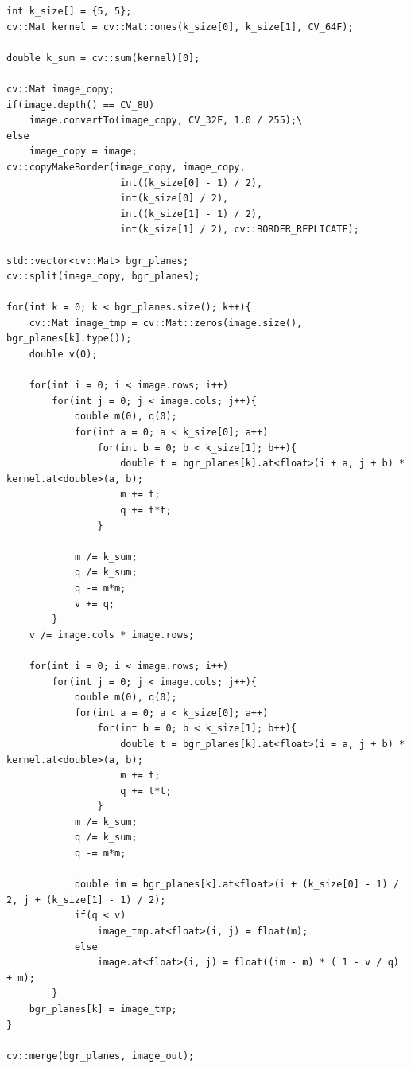 \begin{lstlisting}[style=cpp_white, caption={Исходный код Винеровского фильтра}]
int k_size[] = {5, 5};
cv::Mat kernel = cv::Mat::ones(k_size[0], k_size[1], CV_64F);

double k_sum = cv::sum(kernel)[0];

cv::Mat image_copy;
if(image.depth() == CV_8U)
    image.convertTo(image_copy, CV_32F, 1.0 / 255);\
else    
    image_copy = image;
cv::copyMakeBorder(image_copy, image_copy,
                    int((k_size[0] - 1) / 2),
                    int(k_size[0] / 2),
                    int((k_size[1] - 1) / 2),
                    int(k_size[1] / 2), cv::BORDER_REPLICATE);

std::vector<cv::Mat> bgr_planes;
cv::split(image_copy, bgr_planes);

for(int k = 0; k < bgr_planes.size(); k++){
    cv::Mat image_tmp = cv::Mat::zeros(image.size(), bgr_planes[k].type());
    double v(0);

    for(int i = 0; i < image.rows; i++)
        for(int j = 0; j < image.cols; j++){
            double m(0), q(0);
            for(int a = 0; a < k_size[0]; a++)
                for(int b = 0; b < k_size[1]; b++){
                    double t = bgr_planes[k].at<float>(i + a, j + b) * kernel.at<double>(a, b);
                    m += t;
                    q += t*t;
                }
            
            m /= k_sum;
            q /= k_sum;
            q -= m*m;
            v += q;
        }
    v /= image.cols * image.rows;

    for(int i = 0; i < image.rows; i++)
        for(int j = 0; j < image.cols; j++){
            double m(0), q(0);
            for(int a = 0; a < k_size[0]; a++)
                for(int b = 0; b < k_size[1]; b++){
                    double t = bgr_planes[k].at<float>(i = a, j + b) * kernel.at<double>(a, b);
                    m += t;
                    q += t*t;
                }
            m /= k_sum;
            q /= k_sum;
            q -= m*m;

            double im = bgr_planes[k].at<float>(i + (k_size[0] - 1) / 2, j + (k_size[1] - 1) / 2);
            if(q < v)
                image_tmp.at<float>(i, j) = float(m);
            else
                image.at<float>(i, j) = float((im - m) * ( 1 - v / q) + m);
        }
    bgr_planes[k] = image_tmp;
}

cv::merge(bgr_planes, image_out);
\end{lstlisting}

